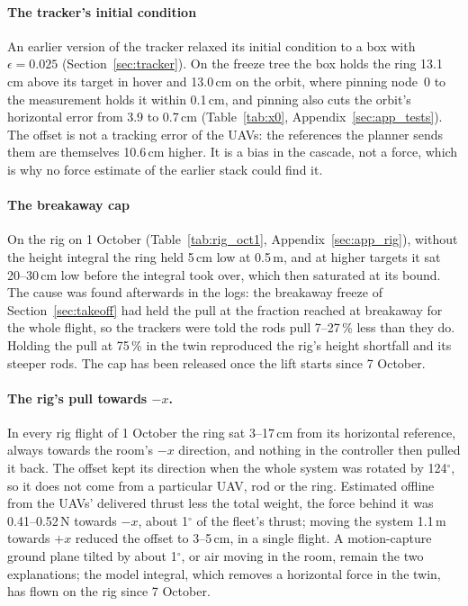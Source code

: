 \paragraph{The tracker's initial condition}
\label{sec:res_ic}

An earlier version of the tracker relaxed its initial condition to a box with $\epsilon = 0.025$
(Section~\ref{sec:tracker}). On the freeze tree the box holds the ring 13.1\,cm above its target in hover and
13.0\,cm on the orbit, where pinning node~0 to the measurement holds it within 0.1\,cm, and pinning also cuts the
orbit's horizontal error from 3.9 to 0.7\,cm (Table~\ref{tab:x0}, Appendix~\ref{sec:app_tests}). The offset is not
a tracking error of the UAVs: the references the planner sends them are themselves 10.6\,cm higher. It is a bias in
the cascade, not a force, which is why no force estimate of the earlier stack could find it.

\paragraph{The breakaway cap}
\label{sec:res_cap}

On the rig on 1 October (Table~\ref{tab:rig_oct1}, Appendix~\ref{sec:app_rig}), without the height integral the ring
held 5\,cm low at 0.5\,m, and at higher targets it sat 20--30\,cm low before the integral took over, which then
saturated at its bound. The cause was found afterwards in the logs: the breakaway freeze of
Section~\ref{sec:takeoff} had held the pull at the fraction reached at breakaway for the whole flight, so the trackers
were told the rods pull 7--27\,\% less than they do. Holding the pull at 75\,\% in the twin reproduced the rig's
height shortfall and its steeper rods. The cap has been released once the lift starts since 7 October.

\paragraph{The rig's pull towards $-x$.} In every rig flight of 1 October the ring sat 3--17\,cm from its horizontal
reference, always towards the room's $-x$ direction, and nothing in the controller then pulled it back. The offset
kept its direction when the whole system was rotated by 124$^\circ$, so it does not come from a particular UAV, rod
or the ring. Estimated offline from the UAVs' delivered thrust less the total weight, the force behind it was
0.41--0.52\,N towards $-x$, about 1$^\circ$ of the fleet's thrust; moving the system 1.1\,m towards $+x$ reduced the
offset to 3--5\,cm, in a single flight. A motion-capture ground plane tilted by about 1$^\circ$, or air moving in
the room, remain the two explanations; the model integral, which removes a horizontal force in the twin, has flown on
the rig since 7 October.


